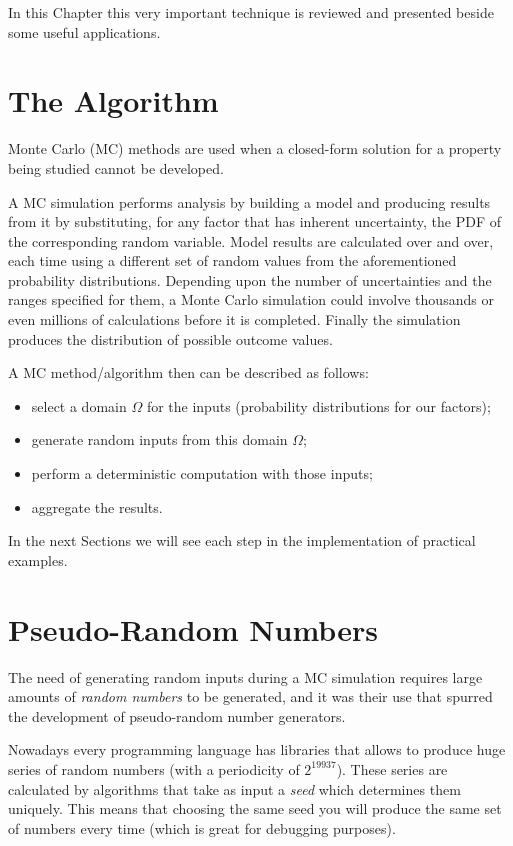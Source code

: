 In this Chapter this very important technique is reviewed and presented
beside some useful applications.

\section{The Algorithm}\label{whats-monte-carlo-simulation}

Monte Carlo (MC) methods are used when a closed-form solution for a
property being studied cannot be developed.

A MC simulation performs analysis by building a model and producing 
results from it by substituting, for any factor that has inherent uncertainty,
the PDF of the corresponding random variable. 
Model results are calculated over and over, each time using a different set of
random values from the aforementioned probability distributions. 
Depending upon the number of uncertainties and the ranges specified for them,
a Monte Carlo simulation could involve thousands or even millions of
calculations before it is completed. Finally the simulation produces the
distribution of possible outcome values.

A MC method/algorithm then can be described as follows: 
\begin{itemize}
	\item  select a domain \(\Omega\) for the inputs (probability distributions for our factors); 
	\item generate random inputs from this domain \(\Omega\);
	\item perform a deterministic computation with those inputs;
	\item aggregate the results.
\end{itemize}

In the next Sections we will see each step in the implementation of
practical examples.

\section{Pseudo-Random Numbers}
\label{pseudo-random-numbers}

The need of generating random inputs during a MC simulation requires 
large amounts of \emph{random numbers} to be generated, and it was their use
that spurred the development of pseudo-random number generators. 

Nowadays every programming language has libraries that allows to produce 
huge series of random numbers (with a periodicity of \(2^{19937}\)). These
series are calculated by algorithms that take as input a \emph{seed} which
determines them uniquely. This means that choosing the same seed you will
produce the same set of numbers every time (which is great for debugging
purposes).

